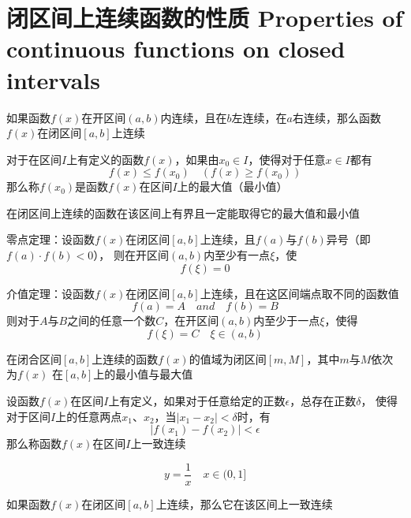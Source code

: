 \documentclass[UTF8]{ctexart}
\begin{document}
\section*{闭区间上连续函数的性质 Properties of continuous functions on closed intervals}

\bigskip

如果函数$f(x)$在开区间$(a,b)$内连续，且在$b$左连续，在$a$右连续，那么函数$f(x)$在闭区间$[a,b]$上连续

\bigskip

对于在区间$I$上有定义的函数$f(x)$，如果由$x_0\in I$，使得对于任意$x\in I$都有
\[ f(x)\le f(x_0)\quad(f(x)\ge f(x_0)) \]
那么称$f(x_0)$是函数$f(x)$在区间$I$上的最大值（最小值）

\bigskip

在闭区间上连续的函数在该区间上有界且一定能取得它的最大值和最小值

\bigskip

零点定理：设函数$f(x)$在闭区间$[a,b]$上连续，且$f(a)$与$f(b)$异号（即$f(a)\cdot f(b)<0$），
则在开区间$(a,b)$内至少有一点$\xi$，使
\[f(\xi)=0\]

\bigskip

介值定理：设函数$f(x)$在闭区间$[a,b]$上连续，且在这区间端点取不同的函数值
\[ f(a)=A \quad and \quad f(b)=B \]
则对于$A$与$B$之间的任意一个数$C$，在开区间$(a,b)$内至少于一点$\xi$，使得
\[ f(\xi)=C\quad\xi\in(a,b) \]

\bigskip

在闭合区间$[a,b]$上连续的函数$f(x)$的值域为闭区间$[m,M]$，其中$m$与$M$依次为$f(x)$
在$[a,b]$上的最小值与最大值

\bigskip

\bigskip

设函数$f(x)$在区间$I$上有定义，如果对于任意给定的正数$\epsilon$，总存在正数$\delta$，
使得对于区间$I$上的任意两点$x_1$、$x_2$，当$|x_1-x_2|<\delta$时，有
\[ |f(x_1)-f(x_2)|<\epsilon \]
那么称函数$f(x)$在区间$I$上一致连续

\bigskip
\[y=\frac{1}{x}\quad x\in(0,1]\]
\bigskip

如果函数$f(x)$在闭区间$[a,b]$上连续，那么它在该区间上一致连续
\end{document}
